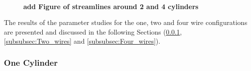 \begin{figure}[H]
\begin{subfigure}{0.49\textwidth}
        \end{subfigure}
        \\
        
        \caption[]{\textbf{add Figure of streamlines around 2 and 4 cylinders}}
        \label{fig:tw_fw_flow_field}
  \end{figure}  

The results of the parameter studies for the one, two and four wire configurations are presented and discussed in the following Sections (\ref{subsubsec:One_wire}, \ref{subsubsec:Two_wires} and \ref{subsubsec:Four_wires}). 

% 



\subsubsection{One Cylinder}
\label{subsubsec:One_wire}

